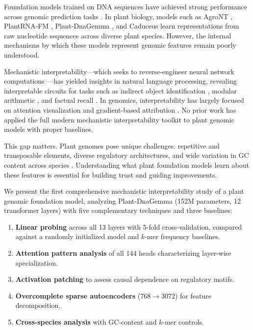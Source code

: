 \documentclass[12pt]{article}
\begin{document}
Foundation models trained on DNA sequences have achieved strong performance across genomic prediction tasks \citep{dalla2023nucleotide, nguyen2024hyenadna, ji2021dnabert, zhou2023dnabert2}. In plant biology, models such as AgroNT \citep{mendoza2024agront}, PlantRNA-FM \citep{yu2024plantrna}, Plant-DnaGemma \citep{zhang2024plantdnagemma}, and Caduceus \citep{schiff2024caduceus} learn representations from raw nucleotide sequences across diverse plant species. However, the internal mechanisms by which these models represent genomic features remain poorly understood.

Mechanistic interpretability---which seeks to reverse-engineer neural network computations \citep{elhage2022toy, olah2020zoom, conmy2023towards}---has yielded insights in natural language processing, revealing interpretable circuits for tasks such as indirect object identification \citep{wang2023interpretability}, modular arithmetic \citep{neel2023grokking}, and factual recall \citep{meng2022locating}. In genomics, interpretability has largely focused on attention visualization and gradient-based attribution \citep{clauwaert2021explainability, avsec2021effective, yu2024plantrna}. No prior work has applied the full modern mechanistic interpretability toolkit to plant genomic models with proper baselines.

This gap matters. Plant genomes pose unique challenges: repetitive and transposable elements, diverse regulatory architectures, and wide variation in GC content across species \citep{schnable2009maize, arabidopsis2000analysis}. Understanding what plant foundation models learn about these features is essential for building trust and guiding improvements.

We present the first comprehensive mechanistic interpretability study of a plant genomic foundation model, analyzing Plant-DnaGemma (152M parameters, 12 transformer layers) with five complementary techniques and three baselines:

\begin{enumerate}
    \item \textbf{Linear probing} across all 13 layers with 5-fold cross-validation, compared against a randomly initialized model and $k$-mer frequency baselines.
    \item \textbf{Attention pattern analysis} of all 144 heads characterizing layer-wise specialization.
    \item \textbf{Activation patching} to assess causal dependence on regulatory motifs.
    \item \textbf{Overcomplete sparse autoencoders} (768$\to$3072) for feature decomposition.
    \item \textbf{Cross-species analysis} with GC-content and $k$-mer controls.
\end{enumerate}
\end{document}
